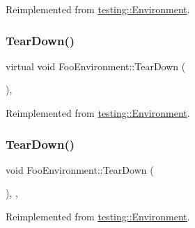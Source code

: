 Reimplemented from \mbox{\hyperlink{classtesting_1_1_environment_a1bf8cafaa9d4eba9feb98655ee434eb3}{testing\+::\+Environment}}.

\mbox{\label{class_foo_environment_a99a2c9df52106cce9e7a4bdda53df802}} 
\subsubsection{\texorpdfstring{TearDown()}{TearDown()}\hspace{0.1cm}{\footnotesize\ttfamily [1/3]}}
{\footnotesize\ttfamily virtual void Foo\+Environment\+::\+Tear\+Down (\begin{DoxyParamCaption}{ }\end{DoxyParamCaption})\hspace{0.3cm}{\ttfamily [inline]}, {\ttfamily [virtual]}}



Reimplemented from \mbox{\hyperlink{classtesting_1_1_environment_a039bdaa705c46b9b88234cf4d3bb6254}{testing\+::\+Environment}}.

\mbox{\label{class_foo_environment_a68511512cce59c5b848dc23b1300dc5a}} 
\subsubsection{\texorpdfstring{TearDown()}{TearDown()}\hspace{0.1cm}{\footnotesize\ttfamily [2/3]}}
{\footnotesize\ttfamily void Foo\+Environment\+::\+Tear\+Down (\begin{DoxyParamCaption}{ }\end{DoxyParamCaption})\hspace{0.3cm}{\ttfamily [inline]}, {\ttfamily [override]}, {\ttfamily [virtual]}}



Reimplemented from \mbox{\hyperlink{classtesting_1_1_environment_a039bdaa705c46b9b88234cf4d3bb6254}{testing\+::\+Environment}}.

\mbox{\label{class_foo_environment_a68511512cce59c5b848dc23b1300dc5a}} 
